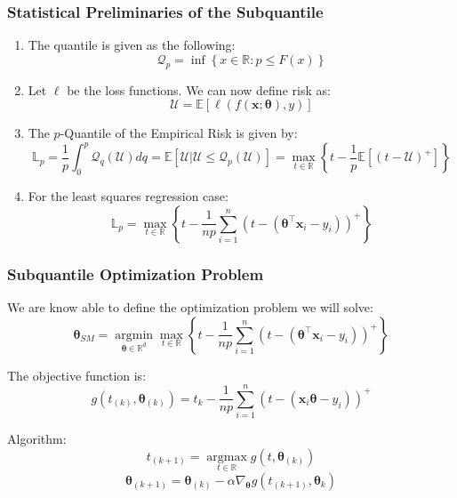 \documentclass[
11pt, %
serif
]{beamer}
\begin{document}
	\begin{frame}
		\frametitle{Statistical Preliminaries of the Subquantile}
		\begin{enumerate}
			\item 
			The quantile is given as the following:
			\begin{equation*}
				\mathcal{Q}_p = \inf\left\{x \in \mathbb{R}: p \leq F(x)\right\}
			\end{equation*}
			\item 
			Let $\ell$ be the loss functions. We can now define risk as:
			\begin{equation*}
				\mathcal{U} = \mathbb{E}\left[\ell(f(\boldsymbol{x};\boldsymbol{\theta}),y)\right]
			\end{equation*}
			\item 
			The $p$-Quantile of the Empirical Risk is given by:
			\begin{equation*}
				\mathbb{L}_p = \frac{1}{p}\int_0^p \mathcal{Q}_q(\mathcal{U})dq = \mathbb{E}\left[\mathcal{U}|\mathcal{U} \leq \mathcal{Q}_p (\mathcal{U})\right] = \max_{t \in \mathbb{R}}\left\{t - \frac{1}{p}\mathbb{E}\left[(t-\mathcal{U})^+\right]\right\}
			\end{equation*}
			\item 
			For the least squares regression case:
			\begin{equation*}
				\mathbb{L}_p = \max_{t\in\mathbb{R}}\left\{t - \frac{1}{np}\sum_{i=1}^n\left(t - \left(\boldsymbol{\theta}^\top\boldsymbol{x}_i - y_i\right)\right)^+\right\}
			\end{equation*}
		\end{enumerate}
	\end{frame}
	
	
	\begin{frame}
		\frametitle{Subquantile Optimization Problem}
		We are know able to define the optimization problem we will solve:
		\begin{equation*}
			\boldsymbol{\theta}_{SM} = \operatorname*{argmin}_{\boldsymbol{\theta} \in \mathbb{R}^d}\max_{t\in\mathbb{R}}\left\{t - \frac{1}{np}\sum_{i=1}^n\left(t - \left(\boldsymbol{\theta}^\top\boldsymbol{x}_i - y_i\right)\right)^+\right\}
		\end{equation*}
		
		The objective function is:
		\begin{equation}
			g(t_{(k)},\boldsymbol{\theta}_{(k)}) = t_k - \frac{1}{np}\sum_{i=1}^{n}\left(t - \left(\boldsymbol{x}_i \boldsymbol{\theta} - y_i\right)\right)^+
		\end{equation}
		
		Algorithm:
		\begin{equation*}
			t_{(k+1)} = \operatorname*{argmax}_{t \in \mathbb{R}}g(t,\boldsymbol{\theta}_{(k)})
		\end{equation*}
		\begin{equation*}
			\boldsymbol{\theta}_{(k+1)} = \boldsymbol{\theta}_{(k)} - \alpha \nabla_{\boldsymbol{\theta}}g(t_{(k+1)}, \boldsymbol{\theta}_k)
		\end{equation*}
		
	\end{frame}
	
\end{document}
